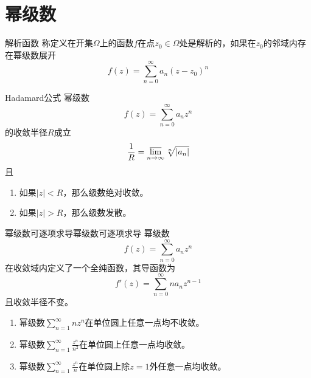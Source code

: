 \documentclass[lang = cn, scheme = chinese, thmcnt = section]{elegantbook}
\newcommand{\dis}{\displaystyle}
\begin{document}
\section{幂级数}

\begin{definition}{解析函数}
	称定义在开集$\Omega$上的函数$f$在点$z_0\in\Omega$处是解析的，如果在$z_0$的邻域内存在幂级数展开
	$$
	f(z)=\sum_{n=0}^{\infty}{a_n(z-z_0)^n}
	$$
\end{definition}

\begin{theorem}{Hadamard公式}
	幂级数
	$$
	f(z)=\sum_{n=0}^{\infty}{a_nz^n}
	$$
	的收敛半径$R$成立%
	$$
	\frac{1}{R}=\varlimsup_{n\to\infty}\sqrt[n]{|a_n|}
	$$
	且
	\begin{enumerate}
		\item 如果$|z|<R$，那么级数绝对收敛。
		\item 如果$|z|>R$，那么级数发散。
	\end{enumerate}
\end{theorem}

\begin{theorem}{幂级数可逐项求导}{幂级数可逐项求导}
	幂级数
	$$
	f(z)=\sum_{n=0}^{\infty}{a_nz^n}
	$$
	在收敛域内定义了一个全纯函数，其导函数为
	$$
	f'(z)=\sum_{n=0}^{\infty}{n a_n z^{n-1}}
	$$
	且收敛半径不变。
\end{theorem}

\begin{proposition}
	\begin{enumerate}
		\item 幂级数$\dis\sum_{n=1}^{\infty}{nz^n}$在单位圆上任意一点均不收敛。
		\item 幂级数$\dis\sum_{n=1}^{\infty}{\frac{z^n}{n^2}}$在单位圆上任意一点均收敛。
		\item 幂级数$\dis\sum_{n=1}^{\infty}{\frac{z^n}{n}}$在单位圆上除$z=1$外任意一点均收敛。
	\end{enumerate}
\end{proposition}
\end{document}
